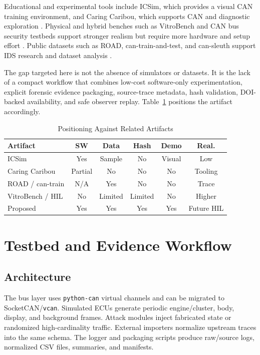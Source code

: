 \documentclass[conference]{IEEEtran}
\begin{document}
Educational and experimental tools include ICSim, which provides a visual CAN training environment, and Caring Caribou, which supports CAN and diagnostic exploration \cite{icsim,caringcaribou,smith2016carhackers}. Physical and hybrid benches such as VitroBench and CAN bus security testbeds support stronger realism but require more hardware and setup effort \cite{yeo2023vitrobench,zhu2022canbus}. Public datasets such as ROAD, can-train-and-test, and can-sleuth support IDS research and dataset analysis \cite{verma2024road,lampe2024cantrain,cansleuth2024}.

The gap targeted here is not the absence of simulators or datasets. It is the lack of a compact workflow that combines low-cost software-only experimentation, explicit forensic evidence packaging, source-trace metadata, hash validation, DOI-backed availability, and safe observer replay. Table~\ref{tab:positioning} positions the artifact accordingly.

\begin{table}[t]
\caption{Positioning Against Related Artifacts}
\label{tab:positioning}
\centering
\footnotesize
\begin{tabular}{p{}ccccc}
\toprule
Artifact & SW & Data & Hash & Demo & Real. \\
\midrule
ICSim & Yes & Sample & No & Visual & Low \\
Caring Caribou & Partial & No & No & No & Tooling \\
ROAD / can-train & N/A & Yes & No & No & Trace \\
VitroBench / HIL & No & Limited & Limited & No & Higher \\
Proposed & Yes & Yes & Yes & Yes & Future HIL \\
\bottomrule
\end{tabular}
\end{table}

\section{Testbed and Evidence Workflow}
\subsection{Architecture}
The bus layer uses \texttt{python-can} virtual channels and can be migrated to SocketCAN/\texttt{vcan}. Simulated ECUs generate periodic engine/cluster, body, display, and background frames. Attack modules inject fabricated state or randomized high-cardinality traffic. External importers normalize upstream traces into the same schema. The logger and packaging scripts produce raw/source logs, normalized CSV files, summaries, and manifests.
\end{document}
